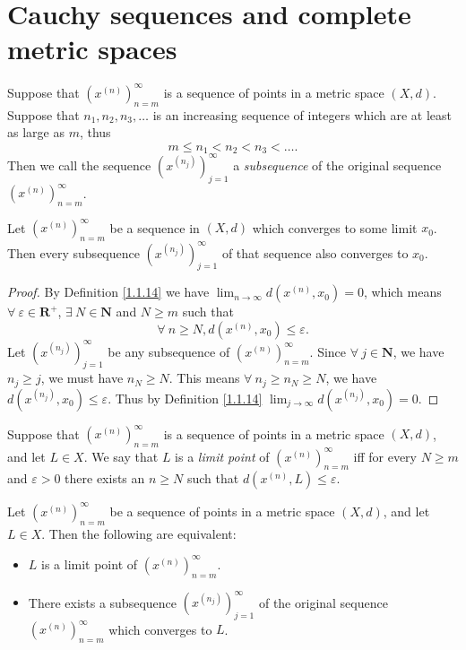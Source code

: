 \section{Cauchy sequences and complete metric spaces}\label{sec 1.4}

\begin{definition}[Subsequences]\label{1.4.1}
    Suppose that \((x^{(n)})_{n = m}^\infty\) is a sequence of points in a metric space \((X, d)\).
    Suppose that \(n_1, n_2, n_3, \dots\) is an increasing sequence of integers which are at least as large as \(m\), thus
    \[
        m \leq n_1 < n_2 < n_3 < \dots.
    \]
    Then we call the sequence \((x^{(n_j)})_{j = 1}^\infty\) a \emph{subsequence} of the original sequence \((x^{(n)})_{n = m}^\infty\).
\end{definition}

\setcounter{theorem}{2}
\begin{lemma}\label{1.4.3}
    Let \((x^{(n)})_{n = m}^\infty\) be a sequence in \((X, d)\) which converges to some limit \(x_0\).
    Then every subsequence \((x^{(n_j)})_{j = 1}^\infty\) of that sequence also converges to \(x_0\).
\end{lemma}

\begin{proof}
    By Definition \ref{1.1.14} we have \(\lim_{n \to \infty} d(x^{(n)}, x_0) = 0\), which means \(\forall\ \varepsilon \in \mathbf{R}^+\), \(\exists\ N \in \mathbf{N}\) and \(N \geq m\) such that
    \[
        \forall\ n \geq N, d(x^{(n)}, x_0) \leq \varepsilon.
    \]
    Let \((x^{(n_j)})_{j = 1}^\infty\) be any subsequence of \((x^{(n)})_{n = m}^\infty\).
    Since \(\forall\ j \in \mathbf{N}\), we have \(n_j \geq j\), we must have \(n_N \geq N\).
    This means \(\forall\ n_j \geq n_N \geq N\), we have \(d(x^{(n_j)}, x_0) \leq \varepsilon\).
    Thus by Definition \ref{1.1.14} \(\lim_{j \to \infty} d(x^{(n_j)}, x_0) = 0\).
\end{proof}

\begin{definition}\label{1.4.4}
    Suppose that \((x^{(n)})_{n = m}^\infty\) is a sequence of points in a metric space \((X, d)\), and let \(L \in X\).
    We say that \(L\) is a \emph{limit point} of \((x^{(n)})_{n = m}^\infty\) iff for every \(N \geq m\) and \(\varepsilon > 0\) there exists an \(n \geq N\) such that \(d(x^{(n)}, L) \leq \varepsilon\).
\end{definition}

\begin{proposition}\label{1.4.5}
    Let \((x^{(n)})_{n = m}^\infty\) be a sequence of points in a metric space \((X, d)\), and let \(L \in X\).
    Then the following are equivalent:
    \begin{itemize}
        \item \(L\) is a limit point of \((x^{(n)})_{n = m}^\infty\).
        \item There exists a subsequence \((x^{(n_j)})_{j = 1}^\infty\) of the original sequence \((x^{(n)})_{n = m}^\infty\) which converges to \(L\).
    \end{itemize}
\end{proposition}

